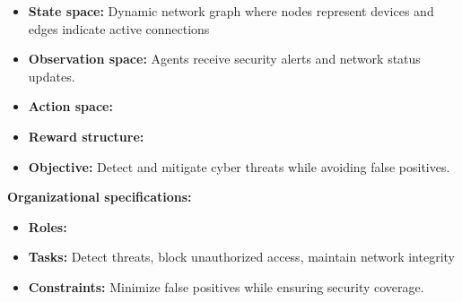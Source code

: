 \begin{itemize}
  \item \textbf{State space:} Dynamic network graph where nodes represent devices and edges indicate active connections
  \item \textbf{Observation space: } Agents receive security alerts and network status updates.
  \item \textbf{Action space:}
  \item \textbf{Reward structure:}
  \item \textbf{Objective:} Detect and mitigate cyber threats while avoiding false positives.
\end{itemize}
%
\textbf{Organizational specifications:}
\begin{itemize}
  \item \textbf{Roles:} 
  \item \textbf{Tasks:} Detect threats, block unauthorized access, maintain network integrity
  \item \textbf{Constraints:} Minimize false positives while ensuring security coverage.
\end{itemize}

